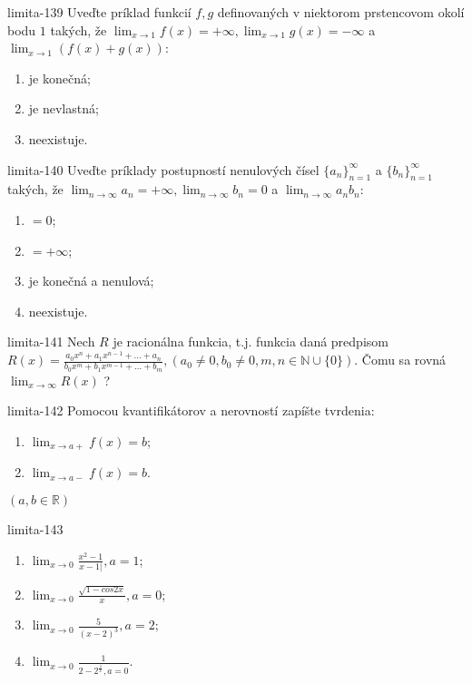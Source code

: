 \begin{defproblem}{limita-139}
Uveďte príklad funkcií $f,g$ definovaných v niektorom prstencovom okolí bodu $1$ takých, že $\lim_{x \rightarrow 1} f(x)=+\infty,\lim_{x \rightarrow 1} g(x)=-\infty$ a $\lim_{x \rightarrow 1} (f(x)+g(x))$:
\begin{enumerate}
\item je konečná;
\item je nevlastná;
\item neexistuje.
\end{enumerate}
\end{defproblem}

\begin{defproblem}{limita-140}
Uveďte príklady postupností nenulových čísel ${\{a_n\}}_{n=1}^\infty$ a ${\{b_n\}}_{n=1}^\infty$ takých, že $\lim_{n \rightarrow \infty} a_n=+\infty,\lim_{n \rightarrow \infty} b_n=0$ a $\lim_{n \rightarrow \infty} a_nb_n$:
\begin{enumerate}
\item $=0$;
\item $=+\infty$;
\item je konečná a nenulová;
\item neexistuje.
\end{enumerate}
\end{defproblem}

\begin{defproblem}{limita-141}
Nech $R$ je racionálna funkcia, t.j. funkcia daná predpisom $R(x)=\frac{a_0x^n+a_1x^{n-1}+...+a_n}{b_0x^m+b_1x^{m-1}+...+b_m},(a_0 \neq 0, b_0 \neq 0,m,n \in \mathbb{N} \cup \{ 0\})$. Čomu sa rovná $\lim_{x \rightarrow \infty} R(x)$ ?
\end{defproblem}

\begin{defproblem}{limita-142}
Pomocou kvantifikátorov a nerovností zapíšte tvrdenia:
\begin{enumerate}
\item $\lim_{x \rightarrow a+} f(x)=b$;
\item $\lim_{x \rightarrow a-} f(x)=b$.
\end{enumerate}
$(a,b \in \mathbb{R})$
\end{defproblem}

\begin{defproblem}{limita-143}
\begin{multicols}{2}
\begin{enumerate}
    \item $\lim_{{x \rightarrow 0}} \frac{x^2-1}{x-1|},a=1$;
    \item $\lim_{{x \rightarrow 0}} \frac{\sqrt{1-cos 2x}}{x},a=0$;
    \item $\lim_{{x \rightarrow 0}} \frac{5}{(x-2)^3},a=2$;
    \item $\lim_{{x \rightarrow 0}} \frac{1}{2-2^{\frac{1}{x}},a=0}$.
\end{enumerate}
\end{multicols}
\end{defproblem}

